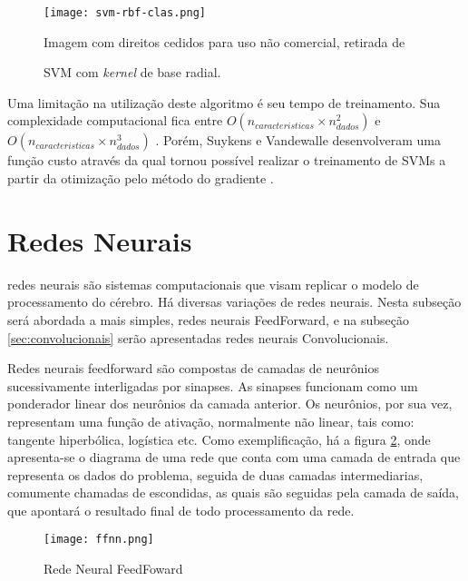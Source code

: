 \begin{figure}
\begin{center} {
    \begin{center}
    \texttt{[image: svm-rbf-clas.png]}
    \caption{SVM com \textit{kernel} de base radial.}
    \small Imagem com direitos cedidos para uso não comercial, retirada de \cite{vanderplas15}
    \label{fig:svm-rbf-clas}
    \end{center}
}
\end{center}
\end{figure}

Uma limitação na utilização deste algoritmo é seu tempo de treinamento. Sua complexidade computacional fica entre $O(n_{caracteristicas} \times n_{dados}^2)$ e $O(n_{caracteristicas} \times n_{dados}^3)$ \cite{list09}. Porém, Suykens e Vandewalle desenvolveram uma função custo através da qual tornou possível realizar o treinamento de SVMs a partir da otimização pelo método do gradiente \cite{suykens99}.

\section{Redes Neurais} \label{sec:nn}

redes neurais são sistemas computacionais que visam replicar o modelo de processamento do cérebro. Há diversas variações de redes neurais. Nesta subseção será abordada a mais simples, redes neurais FeedForward, e na subseção \ref{sec:convolucionais} serão apresentadas redes neurais Convolucionais.

Redes neurais feedforward são compostas de camadas de neurônios sucessivamente interligadas por sinapses. As sinapses funcionam como um ponderador linear dos neurônios da camada anterior. Os neurônios, por sua vez, representam uma função de ativação, normalmente não linear, tais como: tangente hiperbólica, logística etc. Como exemplificação, há a figura \ref{fig:ff-neural-net}, onde apresenta-se o diagrama de uma rede que conta com uma camada de entrada que representa os dados do problema, seguida de duas camadas intermediarias, comumente chamadas de escondidas, as quais são seguidas pela camada de saída, que apontará o resultado final de todo processamento da rede.

\begin{figure}
\begin{center} {
    \begin{center}
    \texttt{[image: ffnn.png]}
    \caption{Rede Neural FeedFoward}
    \label{fig:ff-neural-net}
    \end{center}
}
\end{center}
\end{figure}

